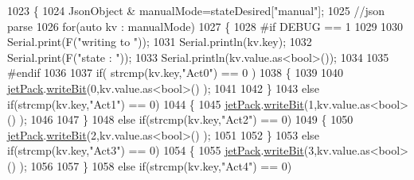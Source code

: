 \begin{DoxyCode}
1023             \{ 
1024                 JsonObject & manualMode=stateDesired[\textcolor{stringliteral}{"manual"}];
1025                 \textcolor{comment}{//json parse}
1026                 \textcolor{keywordflow}{for}(\textcolor{keyword}{auto} kv : manualMode)
1027                 \{
1028 \textcolor{preprocessor}{                #if DEBUG == 1}
1029 
1030                     Serial.print(F(\textcolor{stringliteral}{"writing to "}));
1031                     Serial.println(kv.key);
1032                     Serial.print(F(\textcolor{stringliteral}{"state : "}));
1033                     Serial.println(kv.value.as<\textcolor{keywordtype}{bool}>());        
1034                     
1035 \textcolor{preprocessor}{                #endif              }
1036 
1037                     \textcolor{keywordflow}{if}( strcmp(kv.key,\textcolor{stringliteral}{"Act0"}) == 0 )
1038                     \{
1039                     
1040                         \hyperlink{class_cool_board_a30b1357881b01ccbec676856a91e48e9}{jetPack}.\hyperlink{class_jetpack_a79ae7bc3c1828a0551a7c005c4f8bd00}{writeBit}(0,kv.value.as<\textcolor{keywordtype}{bool}>() ); 
1041                         
1042                     \}
1043                     \textcolor{keywordflow}{else} \textcolor{keywordflow}{if}(strcmp(kv.key,\textcolor{stringliteral}{"Act1"}) == 0)
1044                     \{
1045                         \hyperlink{class_cool_board_a30b1357881b01ccbec676856a91e48e9}{jetPack}.\hyperlink{class_jetpack_a79ae7bc3c1828a0551a7c005c4f8bd00}{writeBit}(1,kv.value.as<\textcolor{keywordtype}{bool}>() ); 
1046 
1047                     \}
1048                     \textcolor{keywordflow}{else} \textcolor{keywordflow}{if}(strcmp(kv.key,\textcolor{stringliteral}{"Act2"}) == 0)
1049                     \{
1050                         \hyperlink{class_cool_board_a30b1357881b01ccbec676856a91e48e9}{jetPack}.\hyperlink{class_jetpack_a79ae7bc3c1828a0551a7c005c4f8bd00}{writeBit}(2,kv.value.as<\textcolor{keywordtype}{bool}>() ); 
1051 
1052                     \}
1053                     \textcolor{keywordflow}{else} \textcolor{keywordflow}{if}(strcmp(kv.key,\textcolor{stringliteral}{"Act3"}) == 0)
1054                     \{
1055                         \hyperlink{class_cool_board_a30b1357881b01ccbec676856a91e48e9}{jetPack}.\hyperlink{class_jetpack_a79ae7bc3c1828a0551a7c005c4f8bd00}{writeBit}(3,kv.value.as<\textcolor{keywordtype}{bool}>() ); 
1056 
1057                     \}
1058                     \textcolor{keywordflow}{else} \textcolor{keywordflow}{if}(strcmp(kv.key,\textcolor{stringliteral}{"Act4"}) == 0)

\end{DoxyCode}

